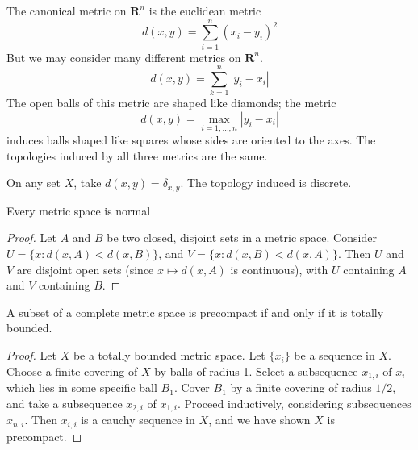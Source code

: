 \begin{example}
\begin{example}
    The canonical metric on $\mathbf{R}^n$ is the euclidean metric
    \[ d(x,y) = \sum_{i = 1}^n (x_i - y_i)^2 \]
    But we may consider many different metrics on $\mathbf{R}^n$.
    \[ d(x,y) = \sum_{k = 1}^n |y_i - x_i| \]
    The open balls of this metric are shaped like diamonds; the metric
    \[ d(x,y) = \max_{i = 1,\dots,n} |y_i - x_i| \]
    induces balls shaped like squares whose sides are oriented to the axes. The topologies induced by all three metrics are the same.
\end{example}

\begin{example}
    On any set $X$, take $d(x,y) = \delta_{x,y}$. The topology induced is discrete.
\end{example}

\begin{theorem}
    Every metric space is normal
\end{theorem}
\begin{proof}
    Let $A$ and $B$ be two closed, disjoint sets in a metric space. Consider $U = \{ x : d(x,A) < d(x,B) \}$, and $V = \{ x : d(x,B) < d(x,A) \}$. Then $U$ and $V$ are disjoint open sets (since $x \mapsto d(x,A)$ is continuous), with $U$ containing $A$ and $V$ containing $B$.
\end{proof}

\begin{theorem}
    A subset of a complete metric space is precompact if and only if it is totally bounded.
\end{theorem}
\begin{proof}
    Let $X$ be a totally bounded metric space. Let $\{ x_i \}$ be a sequence in $X$. Choose a finite covering of $X$ by balls of radius 1. Select a subsequence $x_{1,i}$ of $x_i$ which lies in some specific ball $B_1$. Cover $B_1$ by a finite covering of radius $1/2$, and take a subsequence $x_{2,i}$ of $x_{1,i}$. Proceed inductively, considering subsequences $x_{n,i}$. Then $x_{i,i}$ is a cauchy sequence in $X$, and we have shown $X$ is precompact.
\end{proof}


\end{example}
